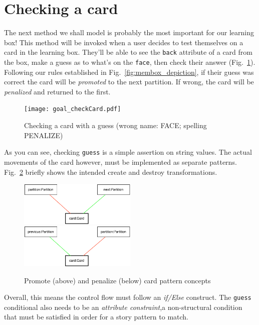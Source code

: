 \newpage
\hypertarget{sec:checkCard}{}
\section{Checking a card}
\genHeader

The next method we shall model is probably the most important for our learning box! This method will be invoked when a user decides to test themselves on a card
in the learning box. They'll be able to see the \texttt{back} attribute of a card from the box, make a guess as to what's on the \texttt{face}, then 
check their answer (Fig.~\ref{fig:goal_check}). Following our rules established in Fig.~\ref{fig:membox_depiction}, if their guess was correct the card will be
\emph{promoted} to the next partition. If wrong, the card will be \emph{penalized} and returned to the first.

\begin{figure}[htbp]
 	\centering
   \texttt{[image: goal\_checkCard.pdf]}
 	\caption{Checking a card with a guess \update (wrong name: FACE; spelling PENALIZE)}
 	\label{fig:goal_check}
\end{figure}
\FloatBarrier

As you can see, checking \texttt{guess} is a simple assertion on string values. The actual movements of the card however, must be implemented as separate
patterns. Fig.~\ref{fig:patterns_check} briefly shows the intended create and destroy transformations.

\begin{figure}[htbp]
 	\centering
   \includegraphics[width=0.5\textwidth]{checkCard_promote.pdf}
   \\ \vspace{1cm}
    \includegraphics[width=0.5\textwidth]{checkCard_penalize.pdf}
 	\caption{Promote (above) and penalize (below) card pattern concepts}
 	\label{fig:patterns_check}
\end{figure}
\FloatBarrier

Overall, this means the control flow must follow an \emph{if/Else} construct. The \texttt{guess} conditional also needs to be an \emph{attribute
constraint},a non-structural condition that must be satisfied in order for a story pattern to match. 





